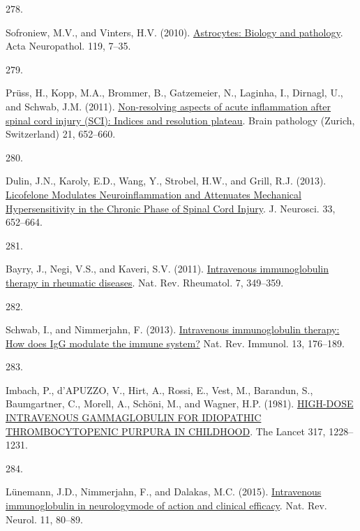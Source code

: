 \documentclass[
]{article}
\newlength{\cslhangindent}
\newlength{\csllabelwidth}
\newlength{\cslentryspacingunit} %
\newenvironment{CSLReferences}[2] %
 {%
  \setlength{\parindent}{0pt}
  \ifodd #1
  \let\oldpar\par
  \def\par{\hangindent=\cslhangindent\oldpar}
  \fi
  \setlength{\parskip}{#2\cslentryspacingunit}
 }%
 {}
\newcommand{\CSLLeftMargin}[1]{\parbox[t]{\csllabelwidth}{#1}}
\newcommand{\CSLRightInline}[1]{\parbox[t]{\linewidth - \csllabelwidth}{#1}\break}
\begin{document}
\begin{CSLReferences}{0}{0}
\leavevmode{}%
\CSLLeftMargin{278. }
\CSLRightInline{Sofroniew, M.V., and Vinters, H.V. (2010). \href{https://doi.org/10.1007/s00401-009-0619-8}{Astrocytes: Biology and pathology}. Acta Neuropathol. 119, 7--35.}

\leavevmode{}%
\CSLLeftMargin{279. }
\CSLRightInline{Prüss, H., Kopp, M.A., Brommer, B., Gatzemeier, N., Laginha, I., Dirnagl, U., and Schwab, J.M. (2011). \href{https://doi.org/10.1111/j.1750-3639.2011.00488.x}{Non-resolving aspects of acute inflammation after spinal cord injury ({SCI}): Indices and resolution plateau}. Brain pathology (Zurich, Switzerland) 21, 652--660.}

\leavevmode{}%
\CSLLeftMargin{280. }
\CSLRightInline{Dulin, J.N., Karoly, E.D., Wang, Y., Strobel, H.W., and Grill, R.J. (2013). \href{https://doi.org/10.1523/JNEUROSCI.6128-11.2013}{Licofelone {Modulates Neuroinflammation} and {Attenuates Mechanical Hypersensitivity} in the {Chronic Phase} of {Spinal Cord Injury}}. J. Neurosci. 33, 652--664.}

\leavevmode{}%
\CSLLeftMargin{281. }
\CSLRightInline{Bayry, J., Negi, V.S., and Kaveri, S.V. (2011). \href{https://doi.org/10.1038/nrrheum.2011.61}{Intravenous immunoglobulin therapy in rheumatic diseases}. Nat. Rev. Rheumatol. 7, 349--359.}

\leavevmode{}%
\CSLLeftMargin{282. }
\CSLRightInline{Schwab, I., and Nimmerjahn, F. (2013). \href{https://doi.org/10.1038/nri3401}{Intravenous immunoglobulin therapy: How does {IgG} modulate the immune system?} Nat. Rev. Immunol. 13, 176--189.}

\leavevmode{}%
\CSLLeftMargin{283. }
\CSLRightInline{Imbach, P., d'APUZZO, V., Hirt, A., Rossi, E., Vest, M., Barandun, S., Baumgartner, C., Morell, A., Schöni, M., and Wagner, H.P. (1981). \href{https://doi.org/10.1016/S0140-6736(81)92400-4}{{HIGH-DOSE INTRAVENOUS GAMMAGLOBULIN FOR IDIOPATHIC THROMBOCYTOPENIC PURPURA IN CHILDHOOD}}. The Lancet 317, 1228--1231.}

\leavevmode{}%
\CSLLeftMargin{284. }
\CSLRightInline{Lünemann, J.D., Nimmerjahn, F., and Dalakas, M.C. (2015). \href{https://doi.org/10.1038/nrneurol.2014.253}{Intravenous immunoglobulin in neurology\textemdash mode of action and clinical efficacy}. Nat. Rev. Neurol. 11, 80--89.}


\end{CSLReferences}
\end{document}
